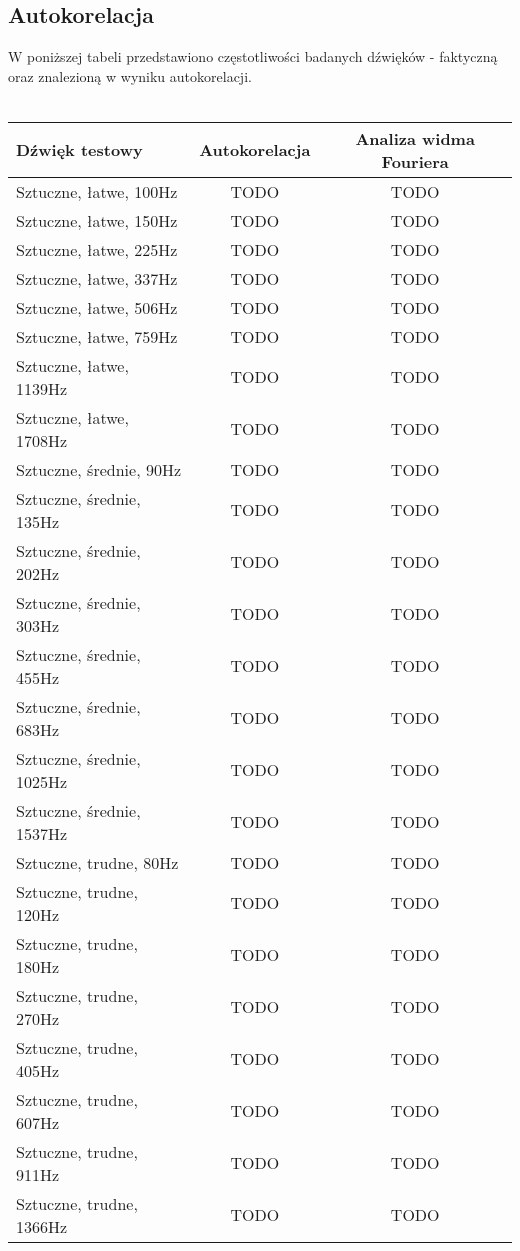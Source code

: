 \documentclass{classrep}
\begin{document}
\subsection{Autokorelacja}
W poniższej tabeli przedstawiono częstotliwości badanych dźwięków - faktyczną oraz znalezioną w wyniku autokorelacji.\\
\\
\begin{tabular}{ l | c | c }
  \hline
  Dźwięk testowy & Autokorelacja & Analiza widma Fouriera \\
  \hline			
  Sztuczne, łatwe, 100Hz & TODO & TODO \\
  Sztuczne, łatwe, 150Hz & TODO & TODO \\
  Sztuczne, łatwe, 225Hz & TODO & TODO \\
  Sztuczne, łatwe, 337Hz & TODO & TODO \\
  Sztuczne, łatwe, 506Hz & TODO & TODO \\
  Sztuczne, łatwe, 759Hz & TODO & TODO \\
  Sztuczne, łatwe, 1139Hz & TODO & TODO \\
  Sztuczne, łatwe, 1708Hz & TODO & TODO \\
  \hline
  Sztuczne, średnie, 90Hz & TODO & TODO \\
  Sztuczne, średnie, 135Hz & TODO & TODO \\
  Sztuczne, średnie, 202Hz & TODO & TODO \\
  Sztuczne, średnie, 303Hz & TODO & TODO \\
  Sztuczne, średnie, 455Hz & TODO & TODO \\
  Sztuczne, średnie, 683Hz & TODO & TODO \\
  Sztuczne, średnie, 1025Hz & TODO & TODO \\
  Sztuczne, średnie, 1537Hz & TODO & TODO \\
  \hline 
  Sztuczne, trudne, 80Hz & TODO & TODO \\
  Sztuczne, trudne, 120Hz & TODO & TODO \\
  Sztuczne, trudne, 180Hz & TODO & TODO \\
  Sztuczne, trudne, 270Hz & TODO & TODO \\
  Sztuczne, trudne, 405Hz & TODO & TODO \\
  Sztuczne, trudne, 607Hz & TODO & TODO \\
  Sztuczne, trudne, 911Hz & TODO & TODO \\
  Sztuczne, trudne, 1366Hz & TODO & TODO \\
  \hline 

\end{tabular}
\end{document}

